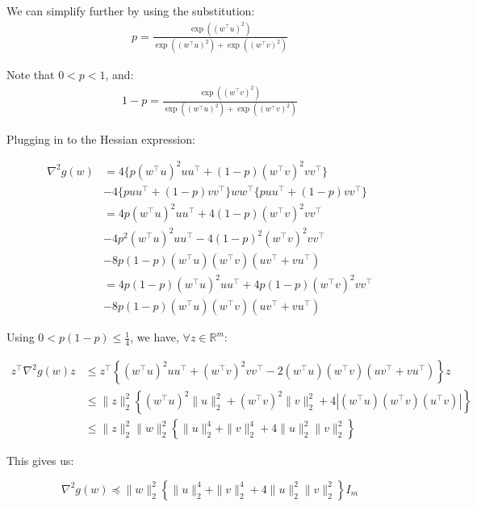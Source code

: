 \documentclass[11pt]{article}
\begin{document}
We can simplify further by using the substitution: 
\begin{align*}
p = \frac{\exp((w^{\top}u)^2)}{ \exp((w^{\top}u)^2) + \exp((w^{\top}v)^2) }
\end{align*}

Note that $0 < p < 1$, and:
\begin{align*}
1 - p = \frac{\exp((w^{\top}v)^2)}{ \exp((w^{\top}u)^2) + \exp((w^{\top}v)^2) }
\end{align*}

Plugging in to the Hessian expression:

\begin{align*}
    \nabla^2 g(w) &= 
    4 \{ p(w^{\top}u)^2 uu^{\top} + (1-p)(w^{\top}v)^2 vv^{\top} \} \\
    &- 4 \{ p uu^{\top} + (1-p) vv^{\top} \}ww^{\top}\{ p uu^{\top} + (1-p) vv^{\top} \} \\
    &= 4 p(w^{\top}u)^2 uu^{\top} + 4 (1-p)(w^{\top}v)^2 vv^{\top} \\
    &- 4 p^2 (w^{\top}u)^2 uu^{\top} - 4 (1-p)^2 (w^{\top}v)^2 vv^{\top} \\
    &- 8 p (1-p) (w^{\top}u)(w^{\top}v)(uv^{\top} + vu^{\top}) \\
    &= 4 p (1 - p) (w^{\top}u)^2 uu^{\top} + 4 p (1-p) (w^{\top}v)^2 vv^{\top} \\
    &- 8 p (1-p) (w^{\top}u)(w^{\top}v)(uv^{\top} + vu^{\top})
\end{align*}

Using $0 < p(1-p) \leq \frac{1}{4}$, we have, $\forall z \in \mathbb{R}^m$:

\begin{align*}
    z^{\top} \nabla^2 g(w) z &\leq
    z^{\top} \left\{ (w^{\top}u)^2 uu^{\top} + (w^{\top}v)^2 vv^{\top} - 2 (w^{\top}u)(w^{\top}v)(uv^{\top} + vu^{\top}) \right\} z \\
    &\leq \|z\|_2^2 \left\{ (w^{\top}u)^2 \|u\|_2^2 + (w^{\top}v)^2 \|v\|_2^2 + 4 \left| (w^{\top}u)(w^{\top}v)(u^{\top}v) \right| \right\} \\
    &\leq \|z\|_2^2 \|w\|_2^2 \left\{ \|u\|_2^4 + \|v\|_2^4 + 4 \|u\|_2^2 \|v\|_2^2 \right\}
\end{align*}

This gives us:

\begin{equation}
    \nabla^2 g(w) \preceq \|w\|_2^2 \left\{ \|u\|_2^4 + \|v\|_2^4 + 4 \|u\|_2^2 \|v\|_2^2 \right\} I_m
\end{equation}
\end{document}
